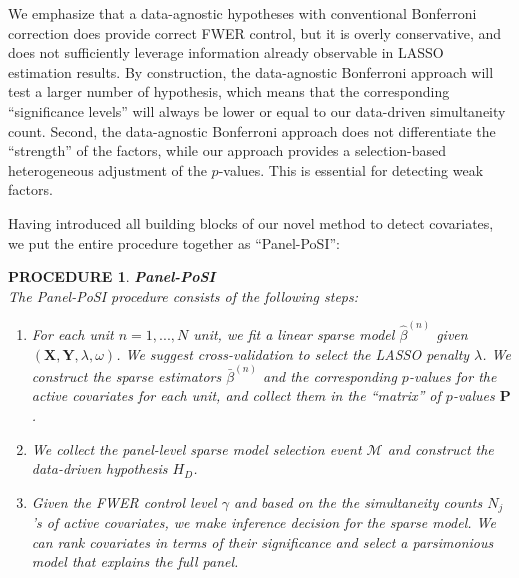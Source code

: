 \documentclass[11pt]{article}
\newtheorem{procedure}{PROCEDURE}
\begin{document}
	We emphasize that a data-agnostic hypotheses with conventional Bonferroni correction does provide correct FWER control, but it is overly conservative, and does not sufficiently leverage information already observable in LASSO estimation results. By construction, the data-agnostic Bonferroni approach will test a larger number of hypothesis, which means that the corresponding ``significance levels'' will always be lower or equal to our data-driven simultaneity count. Second, the data-agnostic Bonferroni approach does not differentiate the ``strength'' of the factors, while our approach provides a selection-based heterogeneous adjustment of the $p$-values. This is essential for detecting weak factors.
	
	
	
	
	
	
	
	
	Having introduced all building blocks of our novel method to detect covariates, we put the entire procedure together as ``Panel-PoSI'':
	
	\begin{procedure}{\bf Panel-PoSI}\\
		The Panel-PoSI procedure consists of the following steps:
		\begin{enumerate}
			\item For each unit $n=1,...,N$ unit, we fit a linear sparse model $\hat{\beta}^{(n)}$ given $(\bm{X},\bm{Y},\lambda,\omega)$. We suggest cross-validation to select the LASSO penalty $\lambda$. We construct the sparse estimators $\bar{\beta}^{(n)}$ and the corresponding $p$-values for the active covariates for each unit, and collect them in the ``matrix'' of $p$-values $\bm{P}$. 
			\item We collect the panel-level sparse model selection event $\mathcal{M}$ and construct the data-driven hypothesis $H_D$.
			\item  Given the FWER control level $\gamma$ and based on the the simultaneity counts $N_j$'s of active covariates, we make inference decision for the sparse model. We can rank covariates in terms of their significance and select a parsimonious model that explains the full panel.
		\end{enumerate}
	\end{procedure}
	
\end{document}
